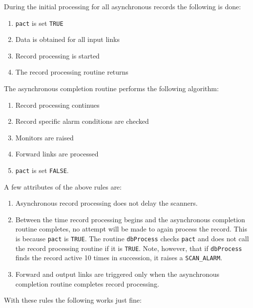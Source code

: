 During the initial processing for all asynchronous records the following is done:

\begin{enumerate}\item \verb|pact| is set \verb|TRUE|

\item Data is obtained for all input links

\item Record processing is started

\item The record processing routine returns

\end{enumerate}The asynchronous completion routine performs the following algorithm:

\begin{enumerate}\item Record processing continues

\item Record specific alarm conditions are checked

\item Monitors are raised

\item Forward links are processed

\item \verb|pact| is set \verb|FALSE|.

\end{enumerate}A few attributes of the above rules are:

\begin{enumerate}\item Asynchronous record processing does not delay the scanners.

\item Between the time record processing begins and the asynchronous completion routine completes, no attempt will be 
made to again process the record. This is because \verb|pact| is \verb|TRUE|. The routine \verb|dbProcess| checks \verb|pact| and does 
not call the record processing routine if it is \verb|TRUE|. Note, however, that if \verb|dbProcess| finds the record active 10 
times in succession, it raises a \verb|SCAN_ALARM|.

\item Forward and output links are triggered only when the asynchronous completion routine completes record 
processing.

\end{enumerate}With these rules the following works just fine:

